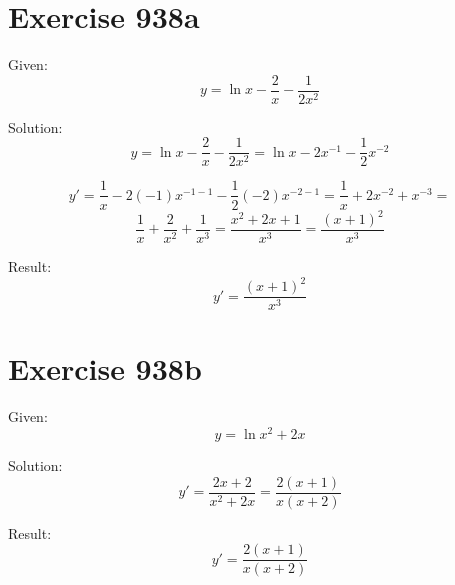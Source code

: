 \documentclass[a4paper, 10pt]{scrartcl}
\begin{document}
\section{Exercise 938a}

Given:
\[
y = \ln{x} - \frac{2}{x} - \frac{1}{2x^{2}}
\]

Solution:
\[
y = \ln{x} - \frac{2}{x} - \frac{1}{2x^{2}} = \ln{x} - 2x^{-1} - \frac{1}{2}x^{-2}
\]

\[
y' = \frac{1}{x} - 2(-1)x^{-1 - 1} - \frac{1}{2}(-2)x^{-2 - 1} = \frac{1}{x} + 2x^{-2} + x^{-3} =
\]
\[
\frac{1}{x} + \frac{2}{x^{2}} + \frac{1}{x^{3}} = \frac{x^{2} + 2x + 1}{x^{3}} = \frac{(x + 1)^{2}}{x^{3}}
\]

Result:
\[
y' = \frac{(x + 1)^{2}}{x^{3}}
\]

\section{Exercise 938b}

Given:
\[
y = \ln{x^{2} + 2x}
\]

Solution:
\[
y' = \frac{2x + 2}{x^{2} + 2x} = \frac{2(x + 1)}{x(x + 2)}
\]

Result:
\[
y' = \frac{2(x + 1)}{x(x + 2)}
\]
\end{document}
